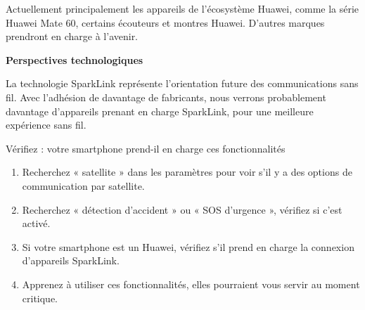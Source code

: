 Actuellement principalement les appareils de l'écosystème Huawei, comme la série Huawei Mate 60, certains écouteurs et montres Huawei. D'autres marques prendront en charge à l'avenir.

\textbf{Perspectives technologiques}\par

La technologie SparkLink représente l'orientation future des communications sans fil. Avec l'adhésion de davantage de fabricants, nous verrons probablement davantage d'appareils prenant en charge SparkLink, pour une meilleure expérience sans fil.

\begin{tcbpractice}{Vérifiez : votre smartphone prend-il en charge ces fonctionnalités}
\begin{enumerate}
  \item Recherchez « satellite » dans les paramètres pour voir s'il y a des options de communication par satellite.
  \item Recherchez « détection d'accident » ou « SOS d'urgence », vérifiez si c'est activé.
  \item Si votre smartphone est un Huawei, vérifiez s'il prend en charge la connexion d'appareils SparkLink.
  \item Apprenez à utiliser ces fonctionnalités, elles pourraient vous servir au moment critique.
\end{enumerate}

\end{tcbpractice}
